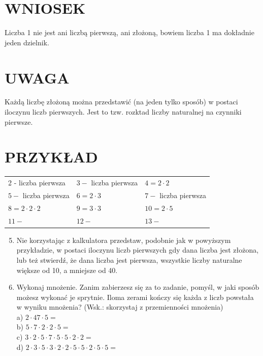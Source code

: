 \documentclass[10pt]{article}
\begin{document}
\section*{WNIOSEK}
Liczba 1 nie jest ani liczbą pierwszą, ani złożoną, bowiem liczba 1 ma dokładnie jeden dzielnik.

\section*{UWAGA}
Każdą liczbę złożoną można przedstawić (na jeden tylko sposób) w postaci iloczynu liczb pierwszych. Jest to tzw. rozktad liczby naturalnej na czynniki pierwsze.

\section*{PRZYKŁAD}
\begin{center}
\begin{tabular}{lll}
2 - liczba pierwsza & \(3-\) liczba pierwsza & \(4=2 \cdot 2\) \\
\(5-\) liczba pierwsza & \(6=2 \cdot 3\) & \(7-\) liczba pierwsza \\
\(8=2 \cdot 2 \cdot 2\) & \(9=3 \cdot 3\) & \(10=2 \cdot 5\) \\
\(11-\) & \(12-\) & \(13-\) \\
\end{tabular}
\end{center}

\begin{enumerate}
  \setcounter{enumi}{4}
  \item Nie korzystając z kalkulatora przedstaw, podobnie jak w powyższym przykładzie, w postaci iloczynu liczb pierwszych gdy dana liczba jest złożona, lub też stwierdź, że dana liczba jest pierwsza, wszystkie liczby naturalne większe od 10, a mniejsze od 40.
  \item Wykonaj mnożenie. Zanim zabierzesz się za to zadanie, pomyśl, w jaki sposób możesz wykonać je sprytnie. Iloma zerami kończy się każda z liczb powstała w wyniku mnożenia? (Wsk.: skorzystaj z przemienności mnożenia)\\
a) \(2 \cdot 47 \cdot 5=\)\\
b) \(5 \cdot 7 \cdot 2 \cdot 2 \cdot 5=\)\\
c) \(3 \cdot 2 \cdot 5 \cdot 7 \cdot 5 \cdot 5 \cdot 2 \cdot 2=\)\\
d) \(2 \cdot 3 \cdot 5 \cdot 3 \cdot 2 \cdot 2 \cdot 5 \cdot 5 \cdot 2 \cdot 5 \cdot 5=\)
\end{enumerate}
\end{document}
